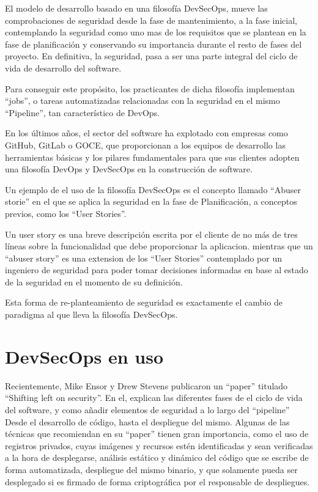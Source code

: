 \documentclass[12pt]{report} %
\begin{document}
El modelo de desarrollo basado en una filosofía DevSecOps, mueve las comprobaciones de seguridad desde la fase de mantenimiento, a la fase inicial, contemplando la seguridad como uno mas de los requisitos que se plantean en la fase de planificación y conservando su importancia durante el resto de fases del proyecto.
En definitiva, la seguridad, pasa a ser una parte integral del ciclo de vida de desarrollo del software. 

Para conseguir este propósito, los practicantes de dicha filosofía implementan ``jobs'', o tareas automatizadas relacionadas con la seguridad en el mismo ``Pipeline'', tan característico de DevOps.

En los últimos años, el sector del software ha explotado con empresas como GitHub, GitLab o GOCE, que proporcionan a los equipos de desarrollo las herramientas básicas y los pilares fundamentales para que sus clientes adopten una filosofía DevOps y DevSecOps en la construcción de software.

Un ejemplo de el uso de la filosofía DevSecOps es el concepto llamado ``Abuser storie'' \cite{Bor2006} en el que se aplica la seguridad en la fase de Planificación, a conceptos previos, como los ``User Stories''.

Un user story es una breve descripción escrita por el cliente de no más de tres líneas sobre la funcionalidad que debe proporcionar la aplicacion.  \cite{XPUserStory} mientras que un ``abuser story'' es una extension de los ``User Stories'' contemplado por un ingeniero de seguridad para poder tomar decisiones informadas en base al estado de la seguridad en el momento de su definición. \cite{Bor2006}

Esta forma de re-planteamiento de seguridad es exactamente el cambio de paradigma al que lleva la filosofía DevSecOps.

\section{DevSecOps en uso}

Recientemente, Mike Ensor y Drew Stevens publicaron un ``paper'' titulado ``Shifting left on security''.
En el, explican las diferentes fases de el ciclo de vida del software, y como añadir elementos de seguridad a lo largo del ``pipeline'' Desde el desarrollo de código, hasta el despliegue del mismo.
Algunas de las técnicas que recomiendan en su ``paper'' tienen gran importancia, como el uso de registros privados, cuyas imágenes y recursos estén identificadas y sean verificadas a la hora de desplegarse, análisis estático y dinámico del código que se escribe de forma automatizada, despliegue del mismo binario, y que solamente pueda ser desplegado si es firmado de forma criptográfica por el responsable de despliegues.\cite{Ensor2021}
\end{document}
